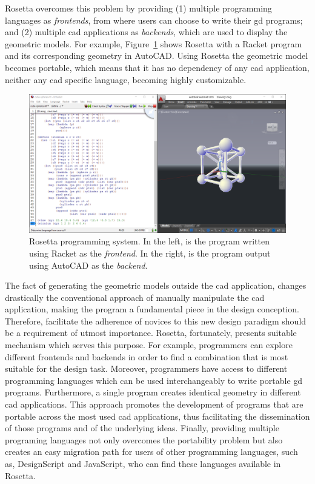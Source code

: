Rosetta overcomes this problem by providing (1) multiple programming languages as \textit{frontends}, from where users can choose to write their \gls{gd} programs; and (2) multiple \gls{cad} applications as \textit{backends}, which are used to
display the geometric models. For example, Figure~\ref{fig:rosetta-gui} shows Rosetta with a Racket program and its corresponding geometry in AutoCAD. Using Rosetta the geometric model becomes portable, which means that it has no dependency of any \gls{cad} application, neither any \gls{cad} specific language, becoming  highly customizable.

\begin{figure}[!h]
  \centering
  \includegraphics[width=.85\textwidth]{images/rosetta-gui}
    \caption{Rosetta programming system. In the left, is the program written using Racket as the \textit{frontend}. In the right, is the program output using AutoCAD as the \textit{backend}.}
  \label{fig:rosetta-gui}
\end{figure}

The fact of generating the geometric models outside the \gls{cad} application, changes drastically the conventional approach of manually manipulate the \gls{cad} application, making the program a fundamental piece in the design conception. Therefore, facilitate the adherence of novices to this new design paradigm should be a requirement of utmost importance. Rosetta, fortunately, presents suitable mechanism which serves this purpose. For example, programmers can explore different frontends and backends in order to find a combination that is most suitable for the design task. Moreover, programmers have access to different programming languages which can be used interchangeably to write portable \gls{gd} programs. Furthermore, a single program creates identical geometry in different \gls{cad} applications. This approach promotes the development of programs that are portable across the most used \gls{cad} applications, thus facilitating the dissemination of those programs and of the underlying ideas. Finally, providing multiple programing languages not only overcomes the portability problem but also creates an easy migration path for users of other programming languages, such as, DesignScript and JavaScript, who can find these languages available in Rosetta.

